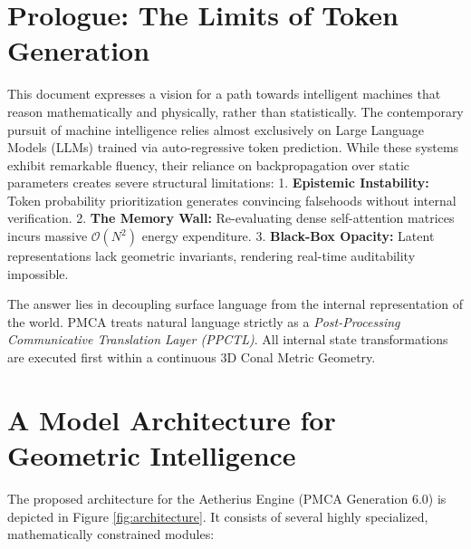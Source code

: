 \documentclass[12pt, a4paper]{article}
\begin{document}
\newpage

\section{Prologue: The Limits of Token Generation}

This document expresses a vision for a path towards intelligent machines that reason mathematically and physically, rather than statistically. The contemporary pursuit of machine intelligence relies almost exclusively on Large Language Models (LLMs) trained via auto-regressive token prediction. While these systems exhibit remarkable fluency, their reliance on backpropagation over static parameters creates severe structural limitations: 
1. \textbf{Epistemic Instability:} Token probability prioritization generates convincing falsehoods without internal verification.
2. \textbf{The Memory Wall:} Re-evaluating dense self-attention matrices incurs massive $\mathcal{O}(N^2)$ energy expenditure.
3. \textbf{Black-Box Opacity:} Latent representations lack geometric invariants, rendering real-time auditability impossible.

The answer lies in decoupling surface language from the internal representation of the world. PMCA treats natural language strictly as a \textit{Post-Processing Communicative Translation Layer (PPCTL)}. All internal state transformations are executed first within a continuous 3D Conal Metric Geometry. 

\section{A Model Architecture for Geometric Intelligence}

The proposed architecture for the Aetherius Engine (PMCA Generation 6.0) is depicted in Figure \ref{fig:architecture}. It consists of several highly specialized, mathematically constrained modules:
\end{document}
